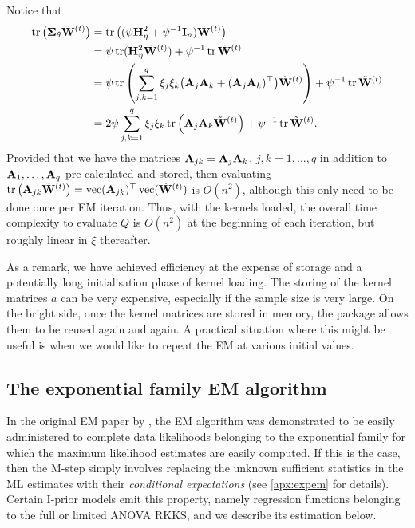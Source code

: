 Notice that
\begin{align*}
  \operatorname{tr}\big({\bm\Sigma}_\theta \tilde{\mathbf W}^{(t)}\big)
  &=  \operatorname{tr}\big( (\psi{\mathbf H}_\eta^2 + \psi^{-1}{\mathbf I}_n ) \tilde{\mathbf W}^{(t)} \big) \\
  &= \psi \operatorname{tr} ({\mathbf H}_\eta^2\tilde{\mathbf W}^{(t)}) + \psi^{-1}\operatorname{tr} \tilde{\mathbf W}^{(t)} \\
  &= \psi \operatorname{tr} \left(\sum_{j,k=1}^q \xi_j \xi_k \big({\mathbf A}_j {\mathbf A}_k + ({\mathbf A}_j {\mathbf A}_k)^\top\big)
   \tilde{\mathbf W}^{(t)}\right) + \psi^{-1}\operatorname{tr} \tilde{\mathbf W}^{(t)} \\
   &= 2\psi \sum_{j,k=1}^q \xi_j \xi_k \operatorname{tr} \left(  {\mathbf A}_j {\mathbf A}_k 
   \tilde{\mathbf W}^{(t)}\right) + \psi^{-1}\operatorname{tr} \tilde{\mathbf W}^{(t)}.
\end{align*}
Provided that we have the matrices ${\mathbf A}_{jk} = {\mathbf A}_j{\mathbf A}_k$, $j,k=1,\dots,q$ in addition to ${\mathbf A}_1,\dots,{\mathbf A}_q$ pre-calculated and stored, then evaluating $\operatorname{tr}\big({\mathbf A}_{jk} \tilde{\mathbf W}^{(t)} \big) = \operatorname{vec}({\mathbf A}_{jk})^\top \operatorname{vec}(\tilde{\mathbf W}^{(t)} )$ is $O(n^2)$, although this  only need to be done once per EM iteration.
Thus, with the kernels loaded, the overall time complexity to evaluate $Q$ is $O(n^2)$ at the beginning of each iteration, but roughly linear in $\xi$ thereafter.

As a remark, we have achieved efficiency at the expense of storage and a potentially long initialisation phase of kernel loading.
The storing of the kernel matrices $a$ can be very expensive, especially if the sample size is very large.
On the bright side, once the kernel matrices are stored in memory, the  package allows them to be reused again and again.
A practical situation where this might be useful is when we would like to repeat the EM at various initial values.

\subsection{The exponential family EM algorithm}
\label{sec:expfamEM}

In the original EM paper by \citet{dempster1977maximum}, the EM algorithm was demonstrated to be easily administered to complete data likelihoods belonging to the exponential family for which the maximum likelihood estimates are easily computed.
If this is the case, then the M-step simply involves replacing the unknown sufficient statistics in the ML estimates with their \emph{conditional expectations} (see \cref{apx:expem} for details).
Certain I-prior models emit this property, namely regression functions belonging to the full or limited ANOVA RKKS, and we describe its estimation below.

